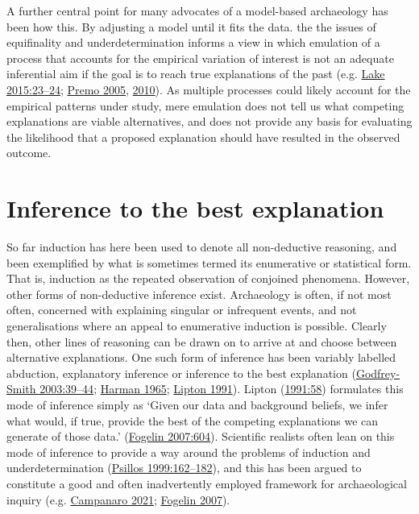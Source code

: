 \documentclass[
  12pt,
  a4paper,
  oneside]{book}
\begin{document}
A further central point for many advocates of a model-based archaeology has been how this. By adjusting a model until it fits the data. the the issues of equifinality and underdetermination informs a view in which emulation of a process that accounts for the empirical variation of interest is not an adequate inferential aim if the goal is to reach true explanations of the past (e.g. \protect\hyperlink{ref-lake2015}{Lake 2015:23--24}; \protect\hyperlink{ref-premo2005}{Premo 2005}, \protect\hyperlink{ref-premo2010}{2010}). As multiple processes could likely account for the empirical patterns under study, mere emulation does not tell us what competing explanations are viable alternatives, and does not provide any basis for evaluating the likelihood that a proposed explanation should have resulted in the observed outcome.

\hypertarget{inference-to-the-best-explanation}{%
\section{Inference to the best explanation}\label{inference-to-the-best-explanation}}

So far induction has here been used to denote all non-deductive reasoning, and been exemplified by what is sometimes termed its enumerative or statistical form. That is, induction as the repeated observation of conjoined phenomena. However, other forms of non-deductive inference exist. Archaeology is often, if not most often, concerned with explaining singular or infrequent events, and not generalisations where an appeal to enumerative induction is possible. Clearly then, other lines of reasoning can be drawn on to arrive at and choose between alternative explanations. One such form of inference has been variably labelled abduction, explanatory inference or inference to the best explanation (\protect\hyperlink{ref-godfrey-smith2003}{Godfrey-Smith 2003:39--44}; \protect\hyperlink{ref-harman1965}{Harman 1965}; \protect\hyperlink{ref-lipton1991}{Lipton 1991}). Lipton (\protect\hyperlink{ref-lipton1991}{1991:58}) formulates this mode of inference simply as `Given our data and background beliefs, we infer what would, if true, provide the best of the competing explanations we can generate of those data.' (\protect\hyperlink{ref-fogelin2007}{Fogelin 2007:604}). Scientific realists often lean on this mode of inference to provide a way around the problems of induction and underdetermination (\protect\hyperlink{ref-psillos1999}{Psillos 1999:162--182}), and this has been argued to constitute a good and often inadvertently employed framework for archaeological inquiry (e.g. \protect\hyperlink{ref-campanaro2021}{Campanaro 2021}; \protect\hyperlink{ref-fogelin2007}{Fogelin 2007}).
\end{document}
